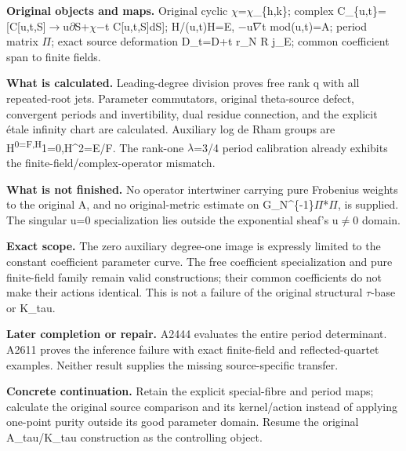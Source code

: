 \textbf{Original objects and maps.} Original cyclic
\allowbreak{}\ensuremath{χ}\allowbreak{}=\allowbreak{}\ensuremath{χ}\allowbreak{}\_\{h,k\};
complex
C\_\{u,t\}=[C[u,t,S]\allowbreak{}\ensuremath{→}\allowbreak{}u\allowbreak{}\ensuremath{∂}\allowbreak{}S+\allowbreak{}\ensuremath{χ}\allowbreak{}\allowbreak{}\ensuremath{−}\allowbreak{}t
C{[}u,t,S{]}dS{]}; H/(u,t)H=E,
\allowbreak{}\ensuremath{−}\allowbreak{}u\allowbreak{}\ensuremath{∇}\allowbreak{}t
mod(u,t)=A; period matrix \allowbreak{}\ensuremath{Π}\allowbreak{};
exact source deformation D\_t=D+t r\_N R j\_E; common coefficient span
to finite fields.

\textbf{What is calculated.} Leading-degree division proves free rank q
with all repeated-root jets. Parameter commutators, original
theta-source defect, convergent periods and invertibility, dual residue
connection, and the explicit étale infinity chart are calculated.
Auxiliary log de Rham groups are H\textsuperscript{0=F,H}1=0,H\^{}2=E/F.
The rank-one \allowbreak{}\ensuremath{λ}\allowbreak{}=3/4 period
calibration already exhibits the finite-field/complex-operator mismatch.

\textbf{What is not finished.} No operator intertwiner carrying pure
Frobenius weights to the original A, and no original-metric estimate on
G\_N\textasciicircum{}\{-1\}\allowbreak{}\ensuremath{Π}\allowbreak{}*\allowbreak{}\ensuremath{Π}\allowbreak{},
is supplied. The singular u=0 specialization lies outside the
exponential sheaf's u\allowbreak{}\ensuremath{≠}\allowbreak{}0 domain.

\textbf{Exact scope.} The zero auxiliary degree-one image is expressly
limited to the constant coefficient parameter curve. The free
coefficient specialization and pure finite-field family remain valid
constructions; their common coefficients do not make their actions
identical. This is not a failure of the original structural
\allowbreak{}\ensuremath{τ}\allowbreak{}-base or K\_tau.

\textbf{Later completion or repair.} A2444 evaluates the entire period
determinant. A2611 proves the inference failure with exact finite-field
and reflected-quartet examples. Neither result supplies the missing
source-specific transfer.

\textbf{Concrete continuation.} Retain the explicit special-fibre and
period maps; calculate the original source comparison and its
kernel/action instead of applying one-point purity outside its good
parameter domain. Resume the original A\_tau/K\_tau construction as the
controlling object.

